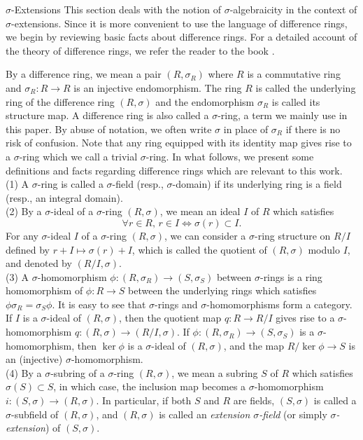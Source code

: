 \documentclass[11pt,a4paper]{article}
\theoremstyle{theorem}
\numberwithin{equation}{section}
\newcommand{\s}{\sigma}
\begin{document}
\begin{section}{$\s$-Extensions}
This section deals with the notion of $\s$-algebraicity in the context of $\s$-extensions. Since it is more convenient to use the language of difference rings, we begin by reviewing basic facts about difference rings. For a detailed account of the theory of difference rings, we refer the reader to the book \cite{levin2008difference}.  

	By a difference ring, we mean a pair $(R,\s_R)$ where  $R$ is a commutative ring  and  $\s_R:R\to R$ is an injective endomorphism. The ring $R$ is called the underlying ring of the difference ring $(R,\s)$ and the endomorphism $\s_R$ is called its structure map. A difference ring is also called a $\s$-ring, a term we mainly use in this paper. By abuse of notation, we often write $\s$ in place of $\s_R$ if there is no risk of confusion. Note that any ring equipped with its identity map gives rise to a $\s$-ring which we call a trivial $\s$-ring. In what follows, we present some definitions and facts regarding difference rings which are relevant to this work. 
	\\
	(1) A $\s$-ring  is called a $\s$-field (resp., $\s$-domain) if its underlying ring is a field (resp., an integral domain). \\
	(2) By a $\s$-ideal of a $\s$-ring $(R,\s)$, we mean an ideal $I$ of $R$ which satisfies 
	$$\forall r\in R,\, r\in I \iff \s(r)\subset I.$$   
	For any $\s$-ideal $I$ of a $\s$-ring $(R,\s)$, we can consider a $\s$-ring structure on $R/I$ defined by $r+I\mapsto \s(r)+I$, which is called the quotient of $(R,\s)$ modulo $I$, and denoted by  $(R/I,\s)$.  \\
	(3) A $\s$-homomorphism $\phi:(R,\s_R)\to (S,\s_S)$ between $\s$-rings is a ring homomorphism of $\phi:R\to S$ between the underlying rings which satisfies $\phi\s_R=\s_S\phi$. It is easy to see that $\s$-rings and $\s$-homomorphisms form a category. If $I$ is a $\s$-ideal of $(R,\s)$, then the quotient map  $q:R\to R/I$ gives rise to a $\s$-homomorphism $q:(R,\s)\to (R/I,\s)$. If $\phi:(R,\s_R)\to (S,\s_S)$ is a $\s$-homomorphism, then $\ker \phi$ is a $\s$-ideal of $(R,\s)$, and the map $R/\ker \phi\to S$ is an (injective)  $\s$-homomorphism. \\
	(4) By a $\s$-subring of a $\s$-ring $(R,\s)$, we mean a subring $S$  of $R$ which satisfies $\s(S)\subset S$, in which case, the inclusion map becomes a $\s$-homomorphism $i:(S,\s)\to (R,\s)$. In particular, if both $S$ and $R$ are fields, $(S,\s)$ is called a $\s$-subfield of $(R,\s)$, and $(R,\s)$ is called an \textit{extension $\s$-field} (or simply \textit{$\s$-extension})  of $(S,\s)$. \\

\end{section}
\end{document}
